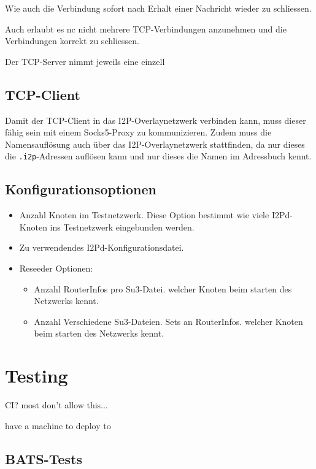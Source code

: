 Wie auch die Verbindung sofort nach Erhalt einer Nachricht wieder zu schliessen.

Auch erlaubt es nc nicht mehrere TCP-Verbindungen anzunehmen und die Verbindungen korrekt zu schliessen.

Der TCP-Server nimmt jeweils eine einzell


\subsection{TCP-Client}

Damit der TCP-Client in das I2P-Overlaynetzwerk verbinden kann, muss dieser fähig sein mit einem Socks5-Proxy zu kommunizieren.
Zudem muss die Namensauflösung auch über das I2P-Overlaynetzwerk stattfinden, da nur dieses die \lstinline|.i2p|-Adressen auflösen kann und nur dieses die Namen im Adressbuch kennt.


\subsection{Konfigurationsoptionen}

\begin{itemize}
    \item Anzahl Knoten im Testnetzwerk. Diese Option bestimmt wie viele I2Pd-Knoten ins Testnetzwerk eingebunden werden.
    \item Zu verwendendes I2Pd-Konfigurationsdatei.
    \item Reseeder Optionen:
        \begin{itemize}
        \item Anzahl RouterInfos pro Su3-Datei. welcher Knoten beim starten des Netzwerks kennt.
        \item Anzahl Verschiedene Su3-Dateien. Sets an RouterInfos. welcher Knoten beim starten des Netzwerks kennt.
        \end{itemize}
\end{itemize}


\section{Testing}

CI? most don't allow this...

have a machine to deploy to

\subsection{BATS-Tests}

